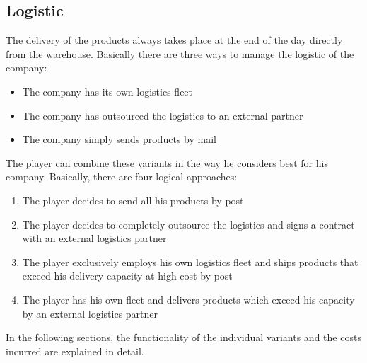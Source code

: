 \subsection{Logistic} \label{logistic_simulation}



The delivery of the products always takes place at the end of the day directly from the warehouse. Basically there are three ways to manage the logistic of the company: 
\begin{itemize}
    \item The company has its own logistics fleet
    \item The company has outsourced the logistics to an external partner
    \item The company simply sends products by mail
\end{itemize}

The player can combine these variants in the way he considers best for his company. Basically, there are four logical approaches:
\begin{enumerate}
    \item The player decides to send all his products by post 
    \item The player decides to completely outsource the logistics and signs a contract with an external logistics partner
    \item The player exclusively employs his own logistics fleet and ships products that exceed his delivery capacity at high cost by post
    \item The player has his own fleet and delivers products which exceed his capacity by an external logistics partner
\end{enumerate}
	
In the following sections, the functionality of the individual variants and the costs incurred are explained in detail.


